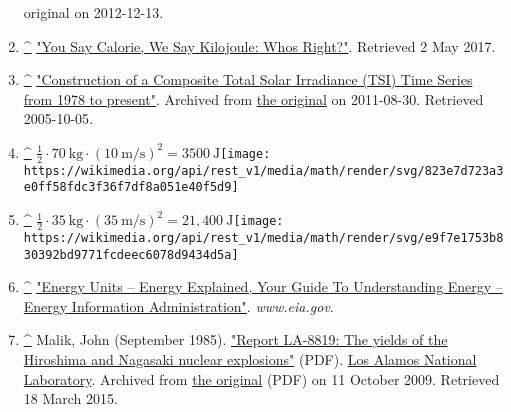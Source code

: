 \documentclass[
]{article}
\newenvironment{LTR}{\beginL}{\endL}
\begin{document}
\begin{LTR}
\begin{otherlanguage}{english}
\begin{enumerate}
{{{  original} on 2012-12-13.{}}}
\item
  \label{cite_note-Cal_vs_kJ-14}{{\textbf{\hyperref[cite_ref-Cal_vs_kJ_14-0]{\^{}}}}
  {\href{https://web.archive.org/web/20230515172626/https://www.coca-colacompany.com/au/news/you-say-calorie--we-say-kilojoule-who-s-right-}{"You
  Say Calorie, We Say Kilojoule: Who\textquotesingle s Right?"}{.
  Retrieved {2 May} 2017}.{}}}
\item
  \label{cite_note-TSI-15}{{\textbf{\hyperref[cite_ref-TSI_15-0]{\^{}}}}
  {\href{https://web.archive.org/web/20110830221302/http://www.pmodwrc.ch/pmod.php?topic=tsi\%2Fcomposite\%2FSolarConstant}{"Construction
  of a Composite Total Solar Irradiance (TSI) Time Series from 1978 to
  present"}. Archived from
  \href{http://www.pmodwrc.ch/pmod.php?topic=tsi/composite/SolarConstant}{the
  original} on 2011-08-30{. Retrieved {2005-10-05}}.{}}}
\item
  \label{cite_note-16}{{\textbf{\hyperref[cite_ref-16]{\^{}}}}
  {{{\(\frac{1}{2} \cdot 70\ \text{kg} \cdot \left( {10\ \text{m/s}} \right)^{2} = 3500\ \text{J}\)}\texttt{[image: https://wikimedia.org/api/rest\_v1/media/math/render/svg/823e7d723a3e0ff58fdc3f36f7df8a051e40f5d9]}}}}
\item
  \label{cite_note-17}{{\textbf{\hyperref[cite_ref-17]{\^{}}}}
  {{{\(\frac{1}{2} \cdot 35\ \text{kg} \cdot \left( {35\ \text{m/s}} \right)^{2} = 21,400\ \text{J}\)}\texttt{[image: https://wikimedia.org/api/rest\_v1/media/math/render/svg/e9f7e1753b830392bd9771fcdeec6078d9434d5a]}}}}
\item
  \label{cite_note-18}{{\textbf{\hyperref[cite_ref-18]{\^{}}}}
  {\href{https://www.eia.gov/energyexplained/index.cfm?page=about_energy_units}{"Energy
  Units -- Energy Explained, Your Guide To Understanding Energy --
  Energy Information Administration"}. \emph{www.eia.gov}.{}}}
\item
  \label{cite_note-hironaga-19}{{\textbf{\hyperref[cite_ref-hironaga_19-0]{\^{}}}}
  {Malik, John (September 1985).
  \href{https://web.archive.org/web/20091011030043/http://www.mbe.doe.gov/me70/manhattan/publications/LANLHiroshimaNagasakiYields.pdf}{"Report
  LA-8819: The yields of the Hiroshima and Nagasaki nuclear explosions"}
  {(PDF)}. \href{/wiki/Los_Alamos_National_Laboratory}{Los Alamos
  National Laboratory}. Archived from
  \href{http://www.mbe.doe.gov/me70/manhattan/publications/LANLHiroshimaNagasakiYields.pdf}{the
  original} {(PDF)} on 11 October 2009{. Retrieved {18 March} 2015}.{}}}

\end{enumerate}
\end{otherlanguage}
\end{LTR}
\end{document}
